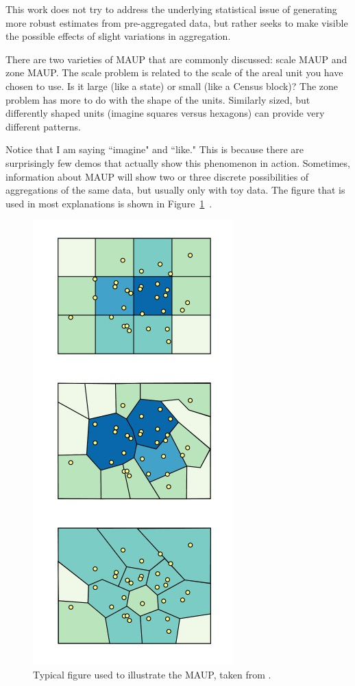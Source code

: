 \documentclass{article}\usepackage[]{graphicx}\usepackage[]{color}
\begin{document}
This work does not try to address the underlying statistical issue of generating more robust estimates from pre-aggregated data, but rather seeks to make visible the possible effects of slight variations in aggregation. 

There are two varieties of MAUP that are commonly discussed: scale MAUP and zone MAUP. The scale problem is related to the scale of the areal unit you have chosen to use. Is it large (like a state) or small (like a Census block)? The zone problem has more to do with the shape of the units. Similarly sized, but differently shaped units (imagine squares versus hexagons) can provide very different patterns. 

Notice that I am saying ``imagine" and ``like." This is because there are surprisingly few demos that actually show this phenomenon in action. Sometimes, information about MAUP will show two or three discrete possibilities of aggregations of the same data, but usually only with toy data. The figure that is used in most explanations is shown in Figure~\ref{MAUP}~\citep{Pen2014, Erv2015}. 

\begin{figure}[htbp]
\begin{centering}
\includegraphics[height=0.5\textheight]{../img/MAUPZone1}
\caption{Typical figure used to illustrate the MAUP, taken from \cite{Erv2015}.}\label{MAUP}
\end{centering}
\end{figure}
\end{document}
